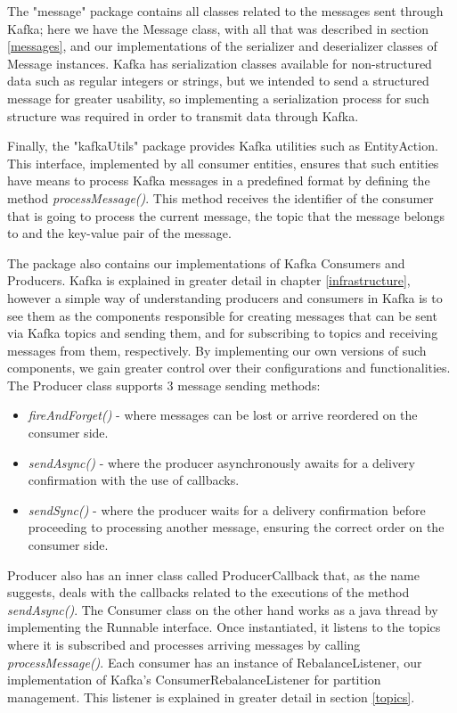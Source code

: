 \documentclass[12pt]{article}
\begin{document}
The "message" package contains all classes related to the messages sent through Kafka; here we have the Message class, with all that was described in section 
\ref{messages}, and our implementations of the serializer and deserializer classes of Message instances.
Kafka has serialization classes available for non-structured data such as regular integers or strings, but we intended to send a structured message for greater 
usability, so implementing a serialization process for such structure was required in order to transmit data through Kafka.

Finally, the "kafkaUtils" package provides Kafka utilities such as EntityAction.
This interface, implemented by all consumer entities, ensures that such entities have means to process Kafka messages in a predefined format by defining the 
method \textit{processMessage()}.
This method receives the identifier of the consumer that is going to process the current message, the topic that the message belongs to and the key-value pair of 
the message.

The package also contains our implementations of Kafka Consumers and Producers.
Kafka is explained in greater detail in chapter \ref{infrastructure}, however a simple way of understanding producers and consumers in Kafka is to see them as 
the components responsible for creating messages that can be sent via Kafka topics and sending them, and for subscribing to topics and receiving messages from them,
respectively.
By implementing our own versions of such components, we gain greater control over their configurations and functionalities.
The Producer class supports 3 message sending methods:
\vspace{-10pt}
\begin{itemize}[noitemsep]
  \item \textit{fireAndForget()} - where messages can be lost or arrive reordered on the consumer side.
  \item \textit{sendAsync()} - where the producer asynchronously awaits for a delivery confirmation with the use of callbacks.
  \item \textit{sendSync()} - where the producer waits for a delivery confirmation before proceeding to processing another message, ensuring the correct order on the consumer side.
\end{itemize}
\vspace{-10pt}
Producer also has an inner class called ProducerCallback that, as the name suggests, deals with the callbacks related to the executions of the method \textit{sendAsync()}.
The Consumer class on the other hand works as a java thread by implementing the Runnable interface.
Once instantiated, it listens to the topics where it is subscribed and processes arriving messages by calling \textit{processMessage()}.
Each consumer has an instance of RebalanceListener, our implementation of Kafka's ConsumerRebalanceListener for partition management.
This listener is explained in greater detail in section \ref{topics}.
\end{document}
